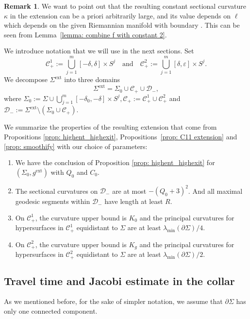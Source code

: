 \documentclass[JEP,XML,SOM,Unicode,NoFloatCountersInSection]{cedram}
\newenvironment{enumeratei}
{\bgroup\def\theenumi{\roman{enumi}}\def\theenumii{\arabic{enumii}}\begin{enumerate}}
{\end{enumerate}\egroup}
\newcommand{\ext}{\mathrm{ext}}
\theoremstyle{definition}
\newtheorem{remark}[theorem]{Remark}
\let\eps\varepsilon
\renewcommand{\>}{{\rangle}}
\newcommand{\<}{{\langle}}
\begin{document}
\begin{remark}\label{remark about kappa}
We want to point out that the resulting constant sectional curvature $\kappa$ in the extension can be a priori arbitrarily large, and its value depends on $\ell$ which depends on the given Riemannian manifold with boundary . This can be seen from Lemma~\ref{lemma: combine f with constant 2}.
\end{remark}

We introduce notation that we will use in the next sections.
Set
\[
\mathcal{C}_+^1:=\bigcup_{j=1}^m[-\delta, \delta] \times S^j\quad\text{and}\quad\mathcal{C}_+^2:=\bigcup_{j=1}^m[\delta, \eps] \times S^j.
\]
We decompose $\Sigma^{\ext}$ into three domains
\[
\Sigma^{\ext}=\Sigma_0\cup \mathcal{C}_+\cup \mathcal{D}_-,
\]
where $\Sigma_0:=\Sigma \cup\bigcup_{j=1}^m [-\delta_0, -\delta]\times S^j, \mathcal{C}_+:=\mathcal{C}_+^1\cup \mathcal{C}_+^2$ and $\mathcal{D}_-:=\Sigma^{\ext}\setminus (\Sigma_0\cup \mathcal{C}_+)$.

We summarize the properties of the resulting extension that come from Propositions \ref{prop: highent_highexit}, Propositions~\ref{prop: C11 extension} and \ref{prop: smoothify} with our choice of parameters:

\begin{enumeratei}
\item\label{enumi:i}
We have the conclusion of Proposition \ref{prop: highent_highexit} for $(\Sigma_0, g^{\ext})$ with $Q_0$ and $C_0$.

\item\label{enumi:ii}
The sectional curvatures on $\mathcal{D}_-$ are at most $-(Q_0+3)^2$. And all maximal geodesic segments within $\mathcal{D}_-$ have length at least $R$.

\item\label{enumi:iii}
On $\mathcal{C}_+^1$, the curvature upper bound is $K_0$ and the principal curvatures for hypersurfaces in $\mathcal{C}_+^1$ equidistant to $\Sigma$ are at least $\lambda_{\min}(\partial\Sigma)/4$.

\item\label{enumi:iv}
On $\mathcal{C}_+^2$, the curvature upper bound is $K_g$ and the principal curvatures for hypersurfaces in $\mathcal{C}_+^2$ equidistant to $\Sigma$ are at least $\lambda_{\min}(\partial\Sigma)/2$.
\end{enumeratei}

\subsection{Travel time and Jacobi estimate in the collar}
As we mentioned before, for the sake of simpler notation, we assume that $\partial\Sigma$ has only one connected component.
\end{document}

